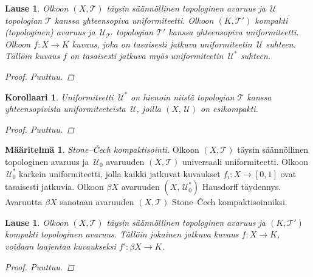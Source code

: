 \documentclass[12pt,a4paper,leqno]{report}
\newcommand{\U}{\,\mathcal{U}}
\newcommand{\T}{\mathcal{T}}
\theoremstyle{plain}
\newtheorem{lause}[equation]{Lause}
\newtheorem{kor}[equation]{Korollaari}
\theoremstyle{definition}
\newtheorem{maar}[equation]{Määritelmä}
\theoremstyle{remark}
\begin{document}
\begin{lause}
Olkoon $(X,\T)$ täysin säännöllinen topologinen avaruus 
ja $\U$ topologian $\T$ kanssa yhteensopiva uniformiteetti. 
Olkoon $(K,\T')$ kompakti (topologinen) avaruus ja 
$\U_{\T'}$ topologian $\T'$ kanssa yhteensopiva uniformiteetti. 
Olkoon $f\colon X\rightarrow K$ kuvaus, joka on tasaisesti jatkuva uniformiteetin $\U$ suhteen. 
Tällöin kuvaus $f$ on tasaisesti jatkuva myös uniformiteetin $\U^*$ suhteen. 
\begin{proof}
Puuttuu.
\end{proof}
\end{lause}

\begin{kor}
Uniformiteetti $\U^*$ on hienoin niistä topologian $\T$ 
kanssa yhteensopivista uniformiteeteista $\U$, 
joilla $(X,\U)$ on esikompakti. 
\begin{proof}
Puuttuu.
\end{proof}
\end{kor}

\begin{maar}
\emph{Stone–Čech kompaktisointi.}
Olkoon $(X,\T)$ täysin säännöllinen topologinen avaruus ja 
$\U_0$ avaruuden $(X,\T)$ universaali uniformiteetti. 
Olkoon $\U^{*}_{0}$ karkein uniformiteetti, 
jolla kaikki jatkuvat kuvaukset $f_i\colon X\rightarrow [0,1]$ 
ovat tasaisesti jatkuvia. 
Olkoon $\beta X$ avaruuden $(X,\U^{*}_{0})$ Hausdorff täydennys.
Avaruutta $\beta X$ sanotaan avaruuden $(X,\T)$ 
Stone–Čech kompaktisoinniksi.
\end{maar}

\begin{lause}
Olkoon $(X,\T)$ täysin säännöllinen topologinen avaruus ja 
$(K,\T')$ kompakti topologinen avaruus. 
Tällöin jokainen jatkuva kuvaus $f\colon X\rightarrow K$, voidaan laajentaa kuvaukseksi $f'\colon \beta X\rightarrow K$.
\begin{proof}
Puuttuu.
\end{proof}
\end{lause}
\end{document}
